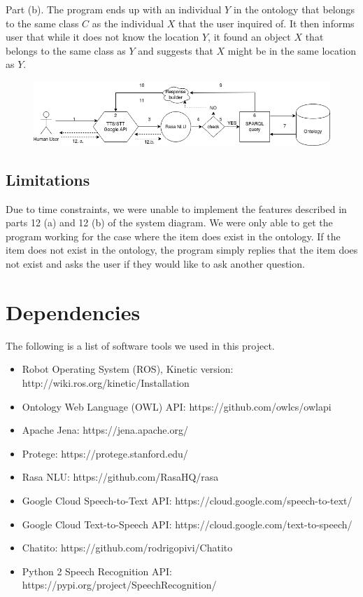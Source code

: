 \documentclass{article}
\begin{document}
\begin{enumerate}
        Part (b). The program ends up with an individual $Y$ in the ontology 
        that belongs to the same class $C$ as the individual $X$ that the 
        user inquired of. It then informs user that while it does not know
        the location $Y$, it found an object $X$ that belongs to the same
        class as $Y$ and suggests that $X$ might be in the same location 
        as $Y$.
\end{enumerate}

\begin{figure}[!h]
\includegraphics[width=\textwidth]{system_diagram.png}
\end{figure}

\subsection{Limitations}
Due to time constraints, we were unable to implement the features 
described in parts 12 (a) and 12 (b) of the system diagram. We were only able
to get the program working for the case where the item does exist in the 
ontology. If the item does not exist in the ontology, the program simply 
replies that the item does not exist and asks the user if they would like to 
ask another question.

\section{Dependencies}
The following is a list of software tools we used in this project.
\begin{itemize}
    \item Robot Operating System (ROS), Kinetic version: 
        http://wiki.ros.org/kinetic/Installation
    \item Ontology Web Language (OWL) API: https://github.com/owlcs/owlapi
    \item Apache Jena: https://jena.apache.org/
    \item Protege: https://protege.stanford.edu/
    \item Rasa NLU: https://github.com/RasaHQ/rasa
    \item Google Cloud Speech-to-Text API: 
        https://cloud.google.com/speech-to-text/
    \item Google Cloud Text-to-Speech API: 
        https://cloud.google.com/text-to-speech/
    \item Chatito: https://github.com/rodrigopivi/Chatito
    \item Python 2 Speech Recognition API: 
        https://pypi.org/project/SpeechRecognition/
\end{itemize}
\end{document}
